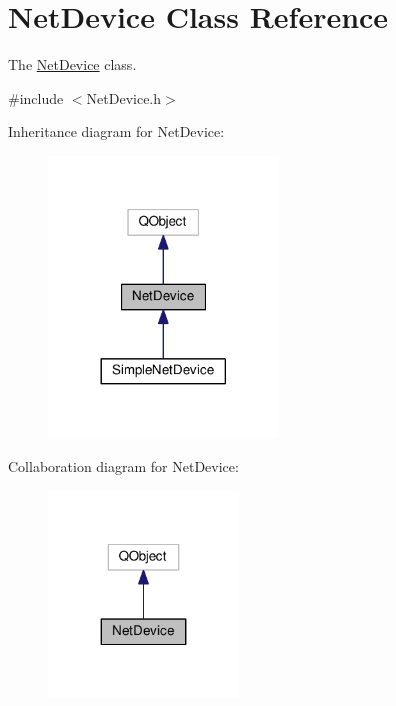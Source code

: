 \hypertarget{classNetDevice}{}\section{Net\+Device Class Reference}
\label{classNetDevice}


The \hyperlink{classNetDevice}{Net\+Device} class.  




{\ttfamily \#include $<$Net\+Device.\+h$>$}



Inheritance diagram for Net\+Device\+:\nopagebreak
\begin{figure}[H]
\begin{center}
\leavevmode
\includegraphics[width=173pt]{classNetDevice__inherit__graph}
\end{center}
\end{figure}


Collaboration diagram for Net\+Device\+:\nopagebreak
\begin{figure}[H]
\begin{center}
\leavevmode
\includegraphics[width=143pt]{classNetDevice__coll__graph}
\end{center}
\end{figure}
